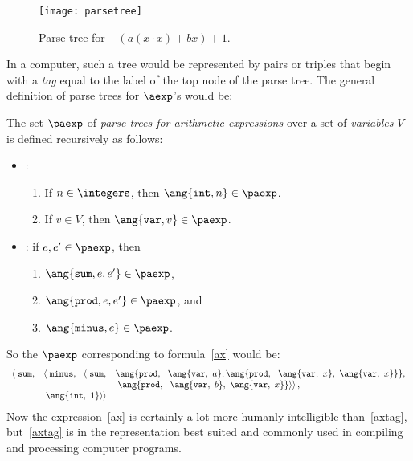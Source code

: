 \begin{definition}
\begin{editingnotes}
\begin{figure}
\texttt{[image: parsetree]}
\caption{Parse tree for $-(a(x\cdot x)+ bx) + 1$.}
\label{fig:parse}
\end{figure}

In a computer, such a tree would be represented by pairs or triples
that begin with a
\emph{tag} equal to the label of the top node of the parse tree.  
The general definition of parse trees for $\aexp$'s would be:


\begin{definition}\label{arithparse}
The set $\paexp$ of \emph{parse trees for arithmetic expressions} 
over a set of
\emph{variables} $V$ is defined recursively as follows:
\begin{itemize}
\item {}:
\begin{enumerate}
\item If $n \in \integers$, then $\ang{\texttt{int}, n} \in \paexp$.
\item If $v \in V$, then $\ang{\texttt{var}, v} \in \paexp$.
\end{enumerate}
\item {}: if $e,e' \in \paexp$, then
\begin{enumerate}
\item $\ang{\texttt{sum}, e, e'} \in \paexp$,
\item $\ang{\texttt{prod}, e, e'} \in \paexp$, and
\item $\ang{\texttt{minus}, e} \in \paexp$.
\end{enumerate}
\end{itemize}
\end{definition}

So the $\paexp$ corresponding to formula~\ref{ax} would be:
\begin{equation}\label{axtag}
\begin{array}{rll}
\left< \right. \texttt{sum}, 
         & \left< \right. \texttt{minus},\ \ \left< \right. \texttt{sum},
               & \ang{\texttt{prod},\ \ \ang{\texttt{var},\ a},
                                     \ang{\texttt{prod},\ \
                                            \ang{\texttt{var},\ x},\
                                            \ang{\texttt{var},\ x}}},\\
                               && \left. \left. \ang{\texttt{prod},\ \
                                       \ang{\texttt{var},\ b},\
                                       \ang{\texttt{var},\ x}}
                                   \right> \right>,\\
         & \left. \left. \ang{\texttt{int},\ 1} \right> \right>
\end{array}
\end{equation}
Now the expression~\ref{ax} is certainly a lot more humanly
intelligible than~\ref{axtag}, but~\ref{axtag} is in the
representation best suited and commonly used in compiling and
processing computer programs.


\end{editingnotes}
\end{definition}
